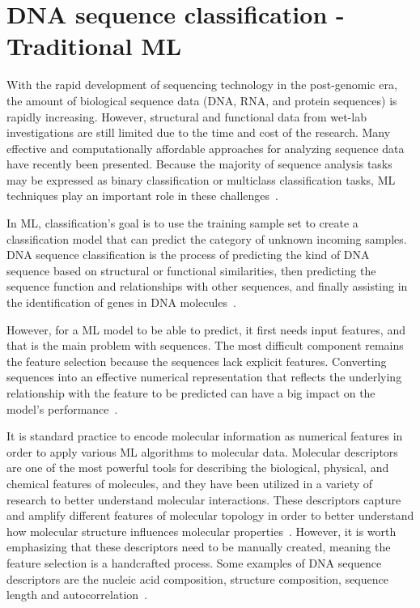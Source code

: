 \section{DNA sequence classification - Traditional ML}

With the rapid development of sequencing technology in the post-genomic era, the amount of biological sequence data (\gls{DNA}, \gls{RNA}, and protein sequences) is rapidly increasing. However, structural and functional data from wet-lab investigations are still limited due to the time and cost of the research. Many effective and computationally affordable approaches for analyzing sequence data have recently been presented. Because the majority of sequence analysis tasks may be expressed as binary classification or multiclass classification tasks, \gls{ML} techniques play an important role in these challenges~\cite{Liu2019BioSeq-Analysis:Approaches}.

In \gls{ML}, classification's goal is to use the training sample set to create a classification model that can predict the category of unknown incoming samples. \gls{DNA} sequence classification is the process of predicting the kind of \gls{DNA} sequence based on structural or functional similarities, then predicting the sequence function and relationships with other sequences, and finally assisting in the identification of genes in \gls{DNA} molecules~\cite{Yang2020ReviewDNA}.

However, for a \gls{ML} model to be able to predict, it first needs input features, and that is the main problem with sequences. The most difficult component remains the feature selection because the sequences lack explicit features. Converting sequences into an effective numerical representation that reflects the underlying relationship with the feature to be predicted can have a big impact on the model's performance~\cite{Chen2020ILearn:Data}.

It is standard practice to encode molecular information as numerical features in order to apply various \gls{ML} algorithms to molecular data. Molecular descriptors are one of the most powerful tools for describing the biological, physical, and chemical features of molecules, and they have been utilized in a variety of research to better understand molecular interactions. These descriptors capture and amplify different features of molecular topology in order to better understand how molecular structure influences molecular properties~\cite{Dong2018PyBioMed:Interactions}. However, it is worth emphasizing that these descriptors need to be manually created, meaning the feature selection is a handcrafted process. Some examples of \gls{DNA} sequence descriptors are the nucleic acid composition, structure composition, sequence length and autocorrelation~\cite{Liu2019BioSeq-Analysis:Approaches,Chen2020ILearn:Data,Bonidia2021MathFeature:Descriptors}.

